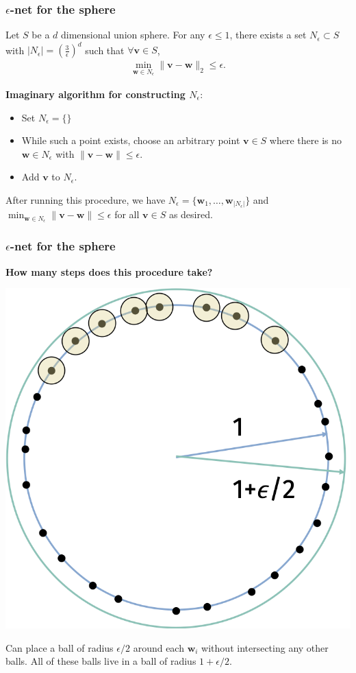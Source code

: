 \documentclass[compress]{beamer}
\newcommand{\bv}[1]{\mathbf{#1}}
\begin{document}
	\begin{frame}[t]
		\frametitle{$\epsilon$-net for the sphere}
		\begin{lemma}
			Let ${S}$ be a $d$ dimensional union sphere.
			For any $\epsilon \leq 1$, there exists a set $N_{\epsilon} \subset S$ with $| N_\epsilon | = \left(\frac{3}{\epsilon}\right)^d$ such that $\forall \bv{v} \in S$,
			\begin{align*}
				\min_{\bv{w} \in N_\epsilon} \|\bv{v} - \bv{w}\|_2 \leq \epsilon. 
			\end{align*}
		\end{lemma} 
		
		\textbf{Imaginary algorithm for constructing $N_\epsilon$}:
		\begin{itemize}
			\item Set $N_\epsilon = \{\}$
			\item While such a point exists, choose an arbitrary point $\bv{v} \in S$ where there is no $\bv{w} \in N_\epsilon$ with $\|\bv{v} - \bv{w}\| \leq \epsilon$. 
			\item Add $\bv{v}$ to $N_\epsilon$.
		\end{itemize}
		After running this procedure, we have $N_\epsilon = \{\bv{w}_1, \ldots, \bv{w}_{|N_\epsilon|}\}$ and $\min_{\bv{w} \in N_\epsilon} \|\bv{v} - \bv{w}\| \leq \epsilon$ for all $\bv{v} \in S$ as desired.
	\end{frame}
	
	\begin{frame}[t]
		\frametitle{$\epsilon$-net for the sphere}
		\begin{center}
			\textbf{\alert{How many steps does this procedure take?}}
			
			\includegraphics[width=.4\textwidth]{net_argument.png}
		\end{center}
	
		
		Can place a ball of radius $\epsilon/2$ around each $\bv{w}_i$ without intersecting any other balls. All of these balls live in a ball of radius $1+\epsilon/2$.
	\end{frame}
	
\end{document}
